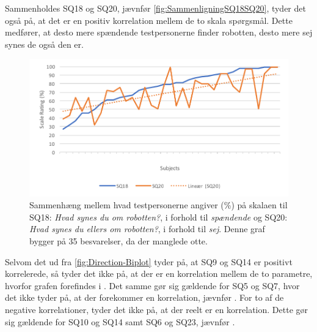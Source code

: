 \noindent
%
Sammenholdes SQ18 og SQ20, jævnfør \autoref{fig:SammenligningSQ18SQ20}, tyder det også på, at det er en positiv korrelation mellem de to skala spørgsmål. Dette medfører, at desto mere spændende testpersonerne finder robotten, desto mere sej synes de også den er.
%
\begin{figure}[H]
	\centering
	\includegraphics[width=\textwidth]{Figure/Korrelationsgrafer/SQ18+SQ20}
	\caption{Sammenhæng mellem hvad testpersonerne angiver (\%) på skalaen til SQ18: \textit{Hvad synes du om robotten?}, i forhold til \textit{spændende} og SQ20: \textit{Hvad synes du ellers om robotten?}, i forhold til \textit{sej}. Denne graf bygger på 35 besvarelser, da der manglede otte.}
	\label{fig:SammenligningSQ18SQ20}
\end{figure}
\noindent
%
Selvom det ud fra \autoref{fig:Direction-Biplot} tyder på, at SQ9 og SQ14 er positivt korrelerede, så tyder det ikke på, at der er en korrelation mellem de to parametre, hvorfor grafen forefindes i . Det samme gør sig gældende for SQ5 og SQ7, hvor det ikke tyder på, at der forekommer en korrelation, jævnfør . For to af de negative korrelationer, tyder det ikke på, at der reelt er en korrelation. Dette gør sig gældende for SQ10 og SQ14 samt SQ6 og SQ23, jævnfør .

